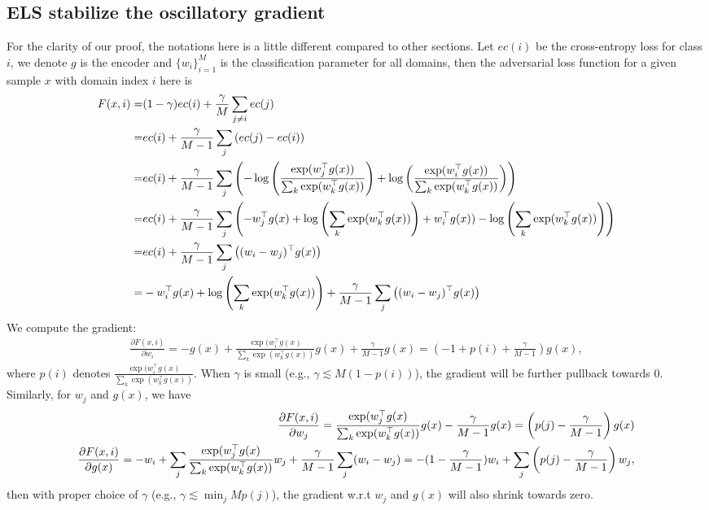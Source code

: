 \documentclass{article} \usepackage{iclr2023_conference,times}
\newcommand{\ls}[0]{ELS\xspace}
\begin{document}
\subsection{\ls stabilize the oscillatory gradient}\label{app_sec:stable}

For the clarity of our proof, the notations here is a little different compared to other sections. Let $ec(i)$ be the cross-entropy loss for class $i$, we denote $g$ is the encoder and $\{w_i\}_{i=1}^M$ is the classification parameter for all domains, then the adversarial loss function for a given sample $x$ with domain index $i$ here is 
\begin{align}
    F(x,i) = &(1-\gamma)ec(i) + \frac{\gamma}{M}\sum_{j\ne i}ec(j)\notag\\
    =&ec(i) + \frac{\gamma}{M-1}\sum_{j}\left(ec(j)-ec(i)\right)\notag\\
    =&ec(i) + \frac{\gamma}{M-1}\sum_{j}\left(-\log\left(\frac{\exp(w_j^{\top}g(x))}{\sum_{k}\exp(w_k^{\top}g(x))}\right)+\log\left(\frac{\exp(w_i^{\top}g(x))}{\sum_{k}\exp(w_k^{\top}g(x))}\right)\right)\notag\\
=&ec(i) + \frac{\gamma}{M-1}\sum_{j}\left(-w_j^{\top}g(x)+\log\left(\sum_{k}\exp(w_k^{\top}g(x))\right)+w_i^{\top}g(x))-\log\left(\sum_{k}\exp(w_k^{\top}g(x))\right)\right)\notag\\
=&ec(i) + \frac{\gamma}{M-1}\sum_{j}\left((w_i-w_j)^{\top}g(x)\right)\notag\\
=&-w_i^{\top}g(x)+\log\left(\sum_{k}\exp(w_k^{\top}g(x))\right) + \frac{\gamma}{M-1}\sum_{j}\left((w_i-w_j)^{\top}g(x)\right)\notag\\
\end{align}
We compute the gradient:
\begin{align}
   \frac{\partial F(x,i)}{\partial w_i} = -g(x)+\frac{\exp(w_i^{\top}g(x)}{\sum_k\exp(w_k^{\top}g(x))}g(x) + \frac{\gamma}{M-1}g(x)
   =\left(-1+p(i)+\frac{\gamma}{M-1}\right)g(x),
\end{align}
where $p(i)$ denotes $\frac{\exp(w_i^{\top}g(x)}{\sum_k\exp(w_k^{\top}g(x))}$. When $\gamma$ is small (e.g., $\gamma \lesssim M(1-p(i))$), the gradient will be further pullback towards 0.
Similarly, for $w_j$ and $g(x)$, we have
\begin{align}
     \frac{\partial F(x,i)}{\partial w_j} = \frac{\exp(w_j^{\top}g(x)}{\sum_k\exp(w_k^{\top}g(x))}g(x) -\frac{\gamma}{M-1}g(x)
   =\left(p(j)-\frac{\gamma}{M-1}\right)g(x)\notag\\
        \frac{\partial F(x,i)}{\partial g(x)} = -w_i+ \sum_{j}\frac{\exp(w_j^{\top}g(x)}{\sum_k\exp(w_k^{\top}g(x))}w_j +\frac{\gamma}{M-1}\sum_{j}(w_i-w_j)
   =-(1-\frac{\gamma}{M-1})w_i + \sum_{j}\left(p(j)-\frac{\gamma}{M-1}\right)w_j,
\end{align}
then with proper choice of $\gamma$ (e.g., $\gamma \lesssim \min_j Mp(j)$), the gradient w.r.t $w_j$ and $g(x)$ will also shrink towards zero.
\end{document}
